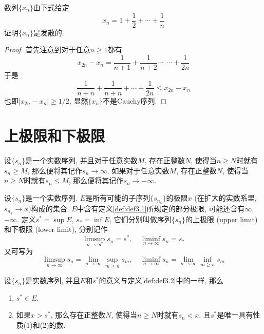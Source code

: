\documentclass[cn,12pt,math=mtpro2,citestyle=gb7714-2015,bibstyle=gb7714-2015,twocol]{elegantbook}
\begin{document}
\begin{example}
数列$\{x_n\}$由下式给定
$$x_n=1+\frac{1}{2}+\cdots+\frac{1}{n}$$
证明$\{x_n\}$是发散的.
\end{example}
\begin{proof}
  首先注意到对于任意$n\ge1$都有
  $$x_{2n}-x_n=\frac{1}{n+1}+\frac{1}{n+2}+\cdots+\frac{1}{2n}$$
  于是
  $$\frac{1}{n+n}+\frac{1}{n+n}+\cdots+\frac{1}{2n}\leq x_{2n}-x_n$$
  也即$|x_{2n}-x_n|\geq 1/2$, 显然$\{x_n\}$不是Cauchy序列.
\end{proof}


\section{上极限和下极限}
\begin{definition}
设$\{s_n\}$是一个实数序列, 并且对于任意实数$M$, 存在正整数$N$, 使得当$n\geq N$时就有$s_n\geq M$, 那么便将其记作$s_n\rightarrow \infty$. 如果对于任意实数$M$, 存在正整数$N$, 使得当$n\geq N$时就有$s_n\leq M$, 那么便将其记作$s_n\rightarrow -\infty$.
\end{definition}
\begin{definition}\label{def:def3.2}
设$\{s_n\}$是一个实数序列. $E$是所有可能的子序列$\{s_{n_k}\}$的极限$x$ (在扩大的实数系里, $s_{n_k}\rightarrow x)$构成的集合. $E$中含有定义\ref{def:def3.1}所规定的部分极限, 可能还含有$\infty$, $-\infty$. 定义$s^\ast=\sup E$, $s_\ast=\inf E$, 它们分别叫做序列$\{s_n\}$的上极限 (upper limit)和下极限 (lower limit), 分别记作
$$\limsup_{n\to\infty} s_n=s^\ast,\quad \liminf_{n\to\infty} s_n=s_\ast$$
又可写为
$$\limsup_{n\to\infty}s_n=\lim_{n\to\infty}\sup_{m\geq n}s_m,\quad \liminf_{n\to\infty}s_n=\lim_{n\to\infty}\inf_{m\geq n}s_m$$
\end{definition}
\begin{theorem}\label{thm:th3.12}
 设$\{s_n\}$是实数序列, 并且$E$和$s^\ast$的意义与定义\ref{def:def3.2}中的一样, 那么
 \begin{enumerate}[label=(\arabic*)]
 \item $s^\ast\in E$.

  \item 如果$x>s^\ast$, 那么存在正整数$N$, 使得当$n\geq N$时就有$s_n<x$, 且$s^\ast$是唯一具有性质(1)和(2)的数.
 \end{enumerate}
\end{theorem}
\end{document}
